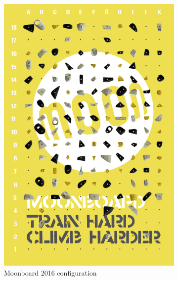 \documentclass{article}
\begin{document}
\begin{figure}
\centering
\begin{subfigure}{.48\textwidth}
  \centering
  \includegraphics[width=.8\linewidth]{moonboard_stock}
  \caption{Moonboard 2016 configuration}
  \label{fig: Stock Moonboard}
\end{subfigure}
\begin{subfigure}{.48\textwidth}
  \centering

\end{subfigure}
\end{figure}
\end{document}
